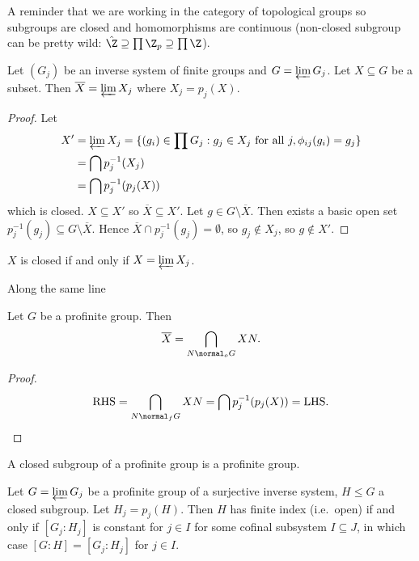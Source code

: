\documentclass[a4paper]{article}
\begin{document}
A reminder that we are working in the category of topological groups so subgroups are closed and homomorphisms are continuous (non-closed subgroup can be pretty wild: \(\hat \Z \supseteq \prod \Z_p \supseteq \prod \Z\)).

\begin{proposition}
  Let \((G_j)\) be an inverse system of finite groups and \(G = \varprojlim G_j\). Let \(X \subseteq G\) be a subset. Then \(\overline X = \varprojlim X_j\) where \(X_j = p_j(X)\).
\end{proposition}

\begin{proof}
  Let
  \begin{align*}
    X'
    &= \varprojlim X_j
    = \{(g_i) \in \prod G_j: g_j \in X_j \text{ for all } j, \phi_{ij}(g_i) = g_j\} \\
    &= \bigcap p_j^{-1}(X_j) \\
    &= \bigcap p_j^{-1}(p_j(X))
  \end{align*}
  which is closed. \(X \subseteq X'\) so \(\overline X \subseteq X'\). Let \(g \in G \setminus \overline X\). Then exists a basic open set \(p_j^{-1}(g_j) \subseteq G \setminus \overline X\). Hence \(\overline X \cap p_j^{-1}(g_j) = \emptyset\), so \(g_j \notin X_j\), so \(g \notin X'\).
\end{proof}

\begin{corollary}
  \(X\) is closed if and only if \(X = \varprojlim X_j\).
\end{corollary}

Along the same line

\begin{proposition}
  Let \(G\) be a profinite group. Then
  \[
    \overline X = \bigcap_{N \normal_o G} XN.
  \]
\end{proposition}

\begin{proof}
  \[
    \mathrm{RHS} = \bigcap_{N \normal_f G} XN = \bigcap p_j^{-1}(p_j(X)) = \mathrm{LHS}.
  \]
\end{proof}

\begin{proposition}
  A closed subgroup of a profinite group is a profinite group.
\end{proposition}

\begin{proposition}
  Let \(G = \varprojlim G_j\) be a profinite group of a surjective inverse system, \(H \leq G\) a closed subgroup. Let \(H_j = p_j(H)\). Then \(H\) has finite index (i.e.\ open) if and only if \([G_j: H_j]\) is constant for \(j \in I\) for some cofinal subsystem \(I \subseteq J\), in which case \([G: H] = [G_j: H_j]\) for \(j \in I\).
\end{proposition}
\end{document}
